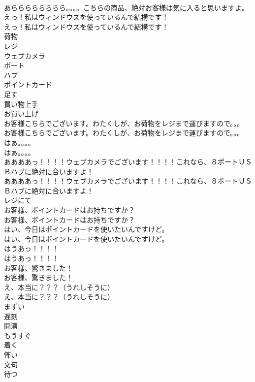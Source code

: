 \documentclass[8pt]{extreport}
\begin{document}
\begin{CJK}{UTF8}{min}
\\	あらららららららら。。。。こちらの商品、絶対お客様は気に入ると思いますよ。 
\\	えっ！私はウィンドウズを使っているんで結構です！	
\\	えっ！私はウィンドウズを使っているんで結構です！ 
\\	荷物
\\	レジ
\\	ウェブカメラ
\\	ポート
\\	ハブ
\\	ポイントカード
\\	足す
\\	買い物上手
\\	お買い上げ
\\	お客様こちらでございます。わたくしが、お荷物をレジまで運びますので。。。	
\\	お客様こちらでございます。わたくしが、お荷物をレジまで運びますので。。。 
\\	はぁ。。。。	
\\	はぁ。。。。 
\\	ああああっ！！！！ウェブカメラでございます！！！！これなら、８ポートＵＳＢハブに絶対に合いますよ！	
\\	ああああっ！！！！ウェブカメラでございます！！！！これなら、８ポートＵＳＢハブに絶対に合いますよ！ 
\\	レジにて	
\\	お客様、ポイントカードはお持ちですか？	
\\	お客様、ポイントカードはお持ちですか？ 
\\	はい、今日はポイントカードを使いたいんですけど。	
\\	はい、今日はポイントカードを使いたいんですけど。 
\\	はうあっ！！！！	
\\	はうあっ！！！！ 
\\	お客様、驚きました！	
\\	お客様、驚きました！ 
\\	え、本当に？？？（うれしそうに）	
\\	え、本当に？？？（うれしそうに） 
\\	まずい
\\	遅刻
\\	開演
\\	もうすぐ
\\	着く
\\	怖い
\\	文句
\\	待つ

\end{CJK}
\end{document}
